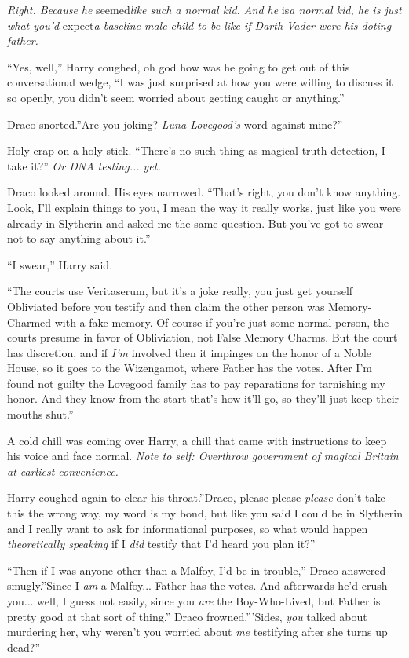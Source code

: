 \emph{Right. Because he} seemed\emph{like such a normal kid. And he}
is\emph{a normal kid, he is just what you'd} expect\emph{a baseline male
child to be like if Darth Vader were his doting father.}

``Yes, well,'' Harry coughed, oh god how was he going to get out of this
conversational wedge, ``I was just surprised at how you were willing to
discuss it so openly, you didn't seem worried about getting caught or
anything.''

Draco snorted.''Are you joking? \emph{Luna Lovegood's} word against
mine?''

Holy crap on a holy stick. ``There's no such thing as magical truth
detection, I take it?'' \emph{Or DNA testing... yet.}

Draco looked around. His eyes narrowed. ``That's right, you don't know
anything. Look, I'll explain things to you, I mean the way it really
works, just like you were already in Slytherin and asked me the same
question. But you've got to swear not to say anything about it.''

``I swear,'' Harry said.

``The courts use Veritaserum, but it's a joke really, you just get
yourself Obliviated before you testify and then claim the other person
was Memory-Charmed with a fake memory. Of course if you're just some
normal person, the courts presume in favor of Obliviation, not False
Memory Charms. But the court has discretion, and if \emph{I'm} involved
then it impinges on the honor of a Noble House, so it goes to the
Wizengamot, where Father has the votes. After I'm found not guilty the
Lovegood family has to pay reparations for tarnishing my honor. And they
know from the start that's how it'll go, so they'll just keep their
mouths shut.''

A cold chill was coming over Harry, a chill that came with instructions
to keep his voice and face normal. \emph{Note to self: Overthrow
government of magical Britain at earliest convenience.}

Harry coughed again to clear his throat.''Draco, please please
\emph{please} don't take this the wrong way, my word is my bond, but
like you said I could be in Slytherin and I really want to ask for
informational purposes, so what would happen \emph{theoretically
speaking} if I \emph{did} testify that I'd heard you plan it?''

``Then if I was anyone other than a Malfoy, I'd be in trouble,'' Draco
answered smugly.''Since I \emph{am} a Malfoy... Father has the
votes. And afterwards he'd crush you... well, I guess not easily,
since you \emph{are} the Boy-Who-Lived, but Father is pretty good at
that sort of thing.'' Draco frowned.'''Sides, \emph{you} talked about
murdering her, why weren't you worried about \emph{me} testifying after
she turns up dead?''

